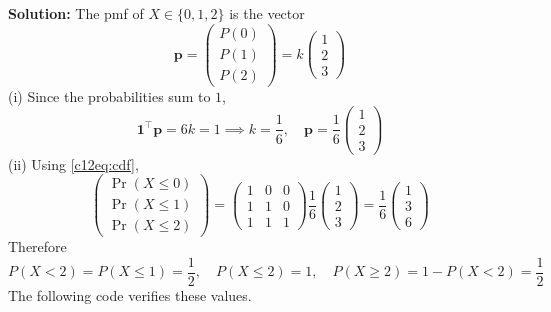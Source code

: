 \textbf{Solution:} The pmf of $X \in \{0,1,2\}$ is the vector
\begin{equation}
\mathbf{p} = \begin{pmatrix} P(0) \\ P(1) \\ P(2) \end{pmatrix} = k\begin{pmatrix} 1 \\ 2 \\ 3 \end{pmatrix}
\end{equation}
(i) Since the probabilities sum to $1$,
\begin{equation}
\mathbf{1}^{\top}\mathbf{p} = 6k = 1 \implies k = \frac{1}{6}, \quad
\mathbf{p} = \frac{1}{6}\begin{pmatrix} 1 \\ 2 \\ 3 \end{pmatrix}
\end{equation}
(ii) Using \eqref{c12eq:cdf},
\begin{equation}
\begin{pmatrix} \Pr(X \le 0) \\ \Pr(X \le 1) \\ \Pr(X \le 2) \end{pmatrix}
= \begin{pmatrix} 1 & 0 & 0 \\ 1 & 1 & 0 \\ 1 & 1 & 1 \end{pmatrix}\frac{1}{6}\begin{pmatrix} 1 \\ 2 \\ 3 \end{pmatrix}
= \frac{1}{6}\begin{pmatrix} 1 \\ 3 \\ 6 \end{pmatrix}
\end{equation}
Therefore
\begin{equation}
P(X < 2) = P(X \le 1) = \frac{1}{2}, \quad
P(X \le 2) = 1, \quad
P(X \ge 2) = 1 - P(X < 2) = \frac{1}{2}
\end{equation}
The following code verifies these values.

\nopagebreak[4]
\begin{center}
\end{center}


